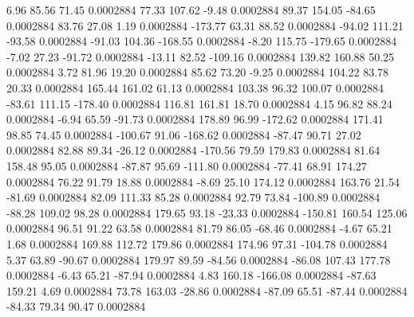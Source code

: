         6.96       85.56       71.45     0.0002884
       77.33      107.62       -9.48     0.0002884
       89.37      154.05      -84.65     0.0002884
       83.76       27.08        1.19     0.0002884
     -173.77       63.31       88.52     0.0002884
      -94.02      111.21      -93.58     0.0002884
      -91.03      104.36     -168.55     0.0002884
       -8.20      115.75     -179.65     0.0002884
       -7.02       27.23      -91.72     0.0002884
      -13.11       82.52     -109.16     0.0002884
      139.82      160.88       50.25     0.0002884
        3.72       81.96       19.20     0.0002884
       85.62       73.20       -9.25     0.0002884
      104.22       83.78       20.33     0.0002884
      165.44      161.02       61.13     0.0002884
      103.38       96.32      100.07     0.0002884
      -83.61      111.15     -178.40     0.0002884
      116.81      161.81       18.70     0.0002884
        4.15       96.82       88.24     0.0002884
       -6.94       65.59      -91.73     0.0002884
      178.89       96.99     -172.62     0.0002884
      171.41       98.85       74.45     0.0002884
     -100.67       91.06     -168.62     0.0002884
      -87.47       90.71       27.02     0.0002884
       82.88       89.34      -26.12     0.0002884
     -170.56       79.59      179.83     0.0002884
       81.64      158.48       95.05     0.0002884
      -87.87       95.69     -111.80     0.0002884
      -77.41       68.91      174.27     0.0002884
       76.22       91.79       18.88     0.0002884
       -8.69       25.10      174.12     0.0002884
      163.76       21.54      -81.69     0.0002884
       82.09      111.33       85.28     0.0002884
       92.79       73.84     -100.89     0.0002884
      -88.28      109.02       98.28     0.0002884
      179.65       93.18      -23.33     0.0002884
     -150.81      160.54      125.06     0.0002884
       96.51       91.22       63.58     0.0002884
       81.79       86.05      -68.46     0.0002884
       -4.67       65.21        1.68     0.0002884
      169.88      112.72      179.86     0.0002884
      174.96       97.31     -104.78     0.0002884
        5.37       63.89      -90.67     0.0002884
      179.97       89.59      -84.56     0.0002884
      -86.08      107.43      177.78     0.0002884
       -6.43       65.21      -87.94     0.0002884
        4.83      160.18     -166.08     0.0002884
      -87.63      159.21        4.69     0.0002884
       73.78      163.03      -28.86     0.0002884
      -87.09       65.51      -87.44     0.0002884
      -84.33       79.34       90.47     0.0002884
